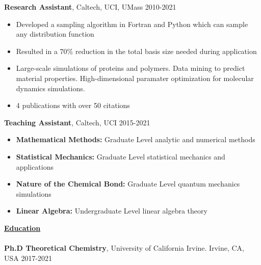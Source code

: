 \documentclass[letterpaper]{article}
\begin{document}
\textbf{Research Assistant}, Caltech, UCI, UMass \hfill 2010-2021
\vspace{-0.2in}\\
\begin{itemize}
  \item Developed a sampling algorithm in Fortran and Python which can sample
  any distribution function
  \vspace{-.1in}
  \item Resulted in a 70\% reduction in the total basis size needed during
  application
  \vspace{-.1in}
  \item Large-scale simulations of proteins and polymers. Data mining to predict
  material properties. High-dimensional paramater optimization for molecular
  dynamics simulations.
  \vspace{-.1in}
  \item 4 publications with over 50 citations
\end{itemize}

\textbf{Teaching Assistant}, Caltech, UCI \hfill 2015-2021
\vspace{-0.2in}\\
\begin{itemize}
    \item \textbf{Mathematical Methods:}
    Graduate Level analytic and numerical methods
    \vspace{-0.05in}
    \item \textbf{Statistical Mechanics:}
    Graduate Level statistical mechanics and applications
    \vspace{-0.05in}
    \item \textbf{Nature of the Chemical Bond:}
    Graduate Level quantum mechanics simulations
    \vspace{-0.05in}
    \item \textbf{Linear Algebra:}
    Undergraduate Level linear algebra theory
\end{itemize}
\vspace{0.15in}
{\large \textbf{\underline{Education}}}\\
\vspace{-0.2in}\\

\textbf{Ph.D Theoretical Chemistry}, University of California Irvine.
Irvine, CA, USA  \hfill 2017-2021\\
\vspace{-0.1in}
\end{document}
